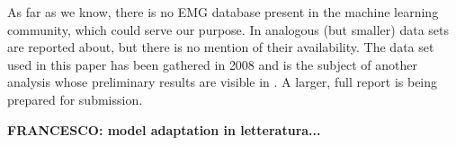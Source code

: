 As far as we know, there is no EMG database present in the machine
learning community, which could serve our purpose. In \cite{...}
analogous (but smaller) data sets are reported about, but there is no
mention of their availability. The data set used in this paper has
been gathered in 2008 and is the subject of another analysis whose
preliminary results are visible in \cite{2008.GNB}. A larger, full
report is being prepared for submission.

\textbf{FRANCESCO: model adaptation in letteratura...}

